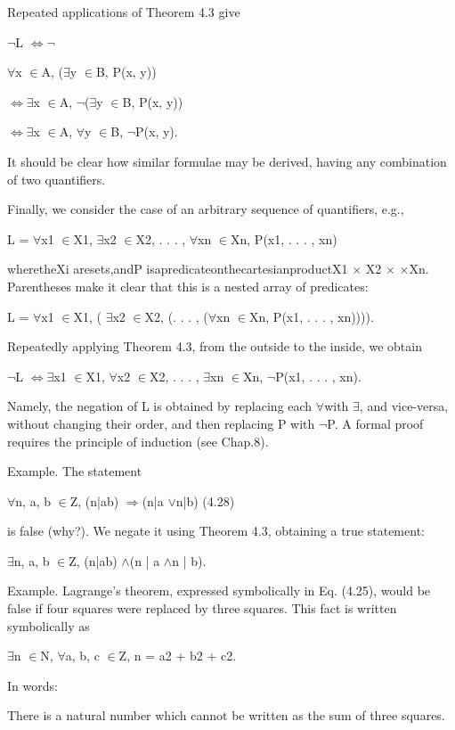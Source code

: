 \documentclass[11pt]{article}
\theoremstyle{plain}
\theoremstyle{definition}
\begin{document}
Repeated applications of Theorem 4.3 give

$\neg$L $\Leftrightarrow$$\neg$

$\forall$x $\in$A, ($\exists$y $\in$B, P(x, y))

$\Leftrightarrow$$\exists$x $\in$A, $\neg$($\exists$y $\in$B, P(x, y))

$\Leftrightarrow$$\exists$x $\in$A, $\forall$y $\in$B, $\neg$P(x, y).

It should be clear how similar formulae may be derived, having any combination of two quantifiers.

Finally, we consider the case of an arbitrary sequence of quantifiers, e.g.,

L = $\forall$x1 $\in$X1, $\exists$x2 $\in$X2, . . . , $\forall$xn $\in$Xn, P(x1, . . . , xn)

wheretheXi aresets,andP isapredicateonthecartesianproductX1 $\times$ X2 $\times$ \textperiodcentered{} \textperiodcentered{} \textperiodcentered{}$\times$Xn. Parentheses make it clear that this is a nested array of predicates:

L = $\forall$x1 $\in$X1, ( $\exists$x2 $\in$X2, (. . . , ($\forall$xn $\in$Xn, P(x1, . . . , xn)))).

Repeatedly applying Theorem 4.3, from the outside to the inside, we obtain

$\neg$L $\Leftrightarrow$$\exists$x1 $\in$X1, $\forall$x2 $\in$X2, . . . , $\exists$xn $\in$Xn, $\neg$P(x1, . . . , xn).

Namely, the negation of L is obtained by replacing each $\forall$with $\exists$, and vice-versa, without changing their order, and then replacing P with $\neg$P. A formal proof requires the principle of induction (see Chap.8).

Example. The statement

$\forall$n, a, b $\in$Z, (n|ab) $\Rightarrow$(n|a $\lor$n|b) (4.28)

is false (why?). We negate it using Theorem 4.3, obtaining a true statement:

$\exists$n, a, b $\in$Z, (n|ab) $\land$(n | a $\land$n | b).

Example. Lagrange's theorem, expressed symbolically in Eq. (4.25), would be false if four squares were replaced by three squares. This fact is written symbolically as

$\exists$n $\in$N, $\forall$a, b, c $\in$Z, n = a2 + b2 + c2.

In words:

There is a natural number which cannot be written as the sum of three squares.
\end{document}
